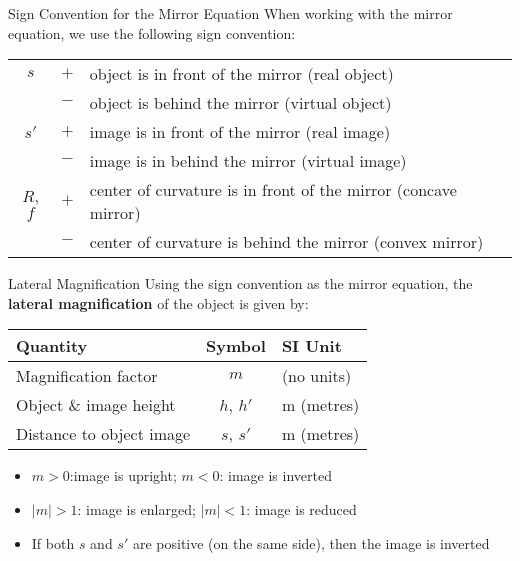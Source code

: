 \documentclass[12pt,compress,aspectratio=169]{beamer}
\newcommand{\eq}[2]{\vspace{#1}{\LARGE\begin{displaymath}#2\end{displaymath}}}
\begin{document}
\begin{frame}{Sign Convention for the Mirror Equation}
  When working with the mirror equation, we use the following sign convention:
  
  \eq{-.2in}{
    \boxed{\frac{1}{s}+\frac{1}{s'}=\frac{1}{f}}
  }
  \begin{center}
    \begin{tabular}{ccl}
      \hline
      $s$ & $+$ & object is in front of the mirror (real object) \\
      & $-$ & object is behind the mirror (virtual object)\\\hline
      $s'$ & $+$ & image is in front of the mirror (real image)\\
      & $-$ & image is in behind the mirror (virtual image)\\\hline
      $R$, $f$ & $+$ & center of curvature is in front of the mirror
      (concave mirror)\\
      & $-$ & center of curvature is behind the mirror (convex mirror)\\
      \hline
    \end{tabular}
  \end{center}
\end{frame}



\begin{frame}{Lateral Magnification}
  Using the sign convention as the mirror equation, the
  \textbf{lateral magnification} of the object is given by:

  \eq{-.2in}{
    \boxed{m=\frac{h'}{h}=-\frac{s'}{s}}
  }
  \begin{center}
    \begin{tabular}{l|c|l}
      \rowcolor{pink}
      \textbf{Quantity} & \textbf{Symbol} & \textbf{SI Unit} \\ \hline
      Magnification factor & $m$ & (no units)\\
      Object \& image height & $h$, $h'$  & \si{\metre} (metres)\\
      Distance to object \7 image & $s$, $s'$  & \si{\metre} (metres)
    \end{tabular}
  \end{center}
  \begin{itemize}
  \item $m>0$:image is upright; $m<0$: image is inverted
  \item $|m|>1$: image is enlarged; $|m|<1$: image is reduced
  \item If both $s$ and $s'$ are positive (on the same side), then the image
    is inverted
  \end{itemize}
\end{frame}
\end{document}

